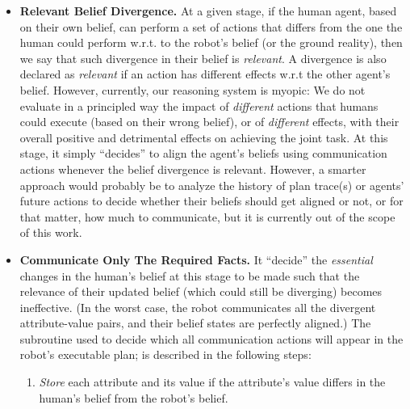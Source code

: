\documentclass[letterpaper]{article} %
\begin{document}


\begin{itemize}
    \item \textbf{Relevant Belief Divergence.}
    At a given stage, if the human agent, based on their own belief, can perform a set of actions that differs from 
    the one 
    the human could perform w.r.t. to the robot's belief (or the ground reality), then we say that such divergence in their belief is \textit{relevant}.
    A divergence is also declared as \textit{relevant} if an action has different effects w.r.t the other agent's belief.
    However, currently, our reasoning system is myopic: We do not evaluate in a principled way the impact of \textit{different} actions that humans could execute (based on their wrong belief), or of \textit{different} effects, with their overall positive and detrimental effects on achieving the joint task. At this stage, it simply ``decides'' to align the agent's beliefs using communication actions whenever the belief divergence is relevant.
    However, a smarter approach would probably be to analyze the history of plan trace(s) or agents' future actions to decide whether their beliefs should get aligned or not, or for that matter, how much to communicate, but it is currently out of the scope of this work. 
    
    \item \textbf{Communicate Only The Required Facts.}
    It ``decide'' the \textit{essential} changes in the human's belief at this stage to be made such that the relevance of their updated belief (which could still be diverging) becomes ineffective. 
    (In the worst case, the robot communicates all the divergent attribute-value pairs, and their belief states are perfectly aligned.) The subroutine used to decide which all communication actions will appear in the robot's executable plan; is described in the following steps:
    \begin{enumerate}
        \item 
        \textit{Store} each attribute and its value if the attribute's value differs in the human's belief from the robot's belief. 
    

\end{enumerate}
\end{itemize}
\end{document}
